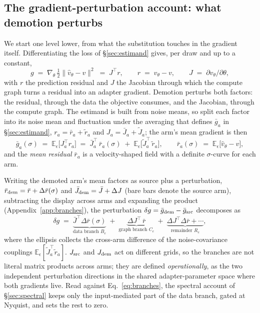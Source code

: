 \subsection{The gradient-perturbation account: what demotion perturbs}
\label{sec:ouraccount}

We start one level lower, from what the substitution touches
in the gradient itself. Differentiating the loss of
\S\ref{sec:estimand} gives, per draw and up to a constant,
\begin{equation*}
g \;=\; \nabla_\theta\, \tfrac12\big\|\hat v_\theta - v\big\|^2
\;=\; J^{\!\top} r,
\qquad
r \;=\; \hat v_\theta - v,
\qquad
J \;=\; \partial \hat v_\theta / \partial \theta,
\end{equation*}
with $r$ the prediction residual and $J$ the Jacobian through which
the compute graph turns a residual into an adapter gradient.
Demotion perturbs both factors: the residual, through the data the
objective consumes, and the Jacobian, through the compute graph. The
estimand is built from noise means, so split each factor into its
noise mean and fluctuation under the averaging that defines
$\bar g_a$ in \S\ref{sec:estimand}, $r_a = \bar r_a + \tilde r_a$ and
$J_a = \bar J_a + \tilde J_a$; the arm's mean gradient is then
\begin{equation*}
\bar g_a(\sigma)
\;=\; \mathbb{E}_\epsilon\!\big[J_a^{\!\top} r_a\big]
\;=\; \bar J_a^{\!\top}\,\bar r_a(\sigma)
\;+\; \mathbb{E}_\epsilon\!\big[\tilde J_a^{\!\top}\,\tilde r_a\big],
\qquad
\bar r_a(\sigma) \;=\; \mathbb{E}_\epsilon\big[\hat v_\theta - v\big],
\end{equation*}
and the \emph{mean residual} $\bar r_a$ is a velocity-shaped field
with a definite $\sigma$-curve for each arm.

Writing the demoted
arm's mean factors as source plus a perturbation,
$\bar r_{\mathrm{dem}} = \bar r + \Delta\bar r(\sigma)$ and
$\bar J_{\mathrm{dem}} = \bar J + \Delta J$ (bare bars denote the source arm),
subtracting the display across arms and expanding the product
(Appendix~\ref{app:branches}), the perturbation
$\delta g = \bar g_{\mathrm{dem}} - \bar g_{\mathrm{src}}$ decomposes as
\begin{equation}
\delta g \;=\;
\underbrace{\bar J^{\!\top}\Delta \bar r(\sigma)}_{\text{data branch }B_e}
\;+\; \underbrace{\Delta J^{\!\top}\, \bar r}_{\text{graph branch }C_e}
\;+\; \underbrace{\Delta J^{\!\top}\Delta \bar r + \cdots}_{\text{remainder }R_e},
\label{eq:branches}
\end{equation}
where the ellipsis collects the cross-arm difference of the
noise-covariance couplings
$\mathbb{E}_\epsilon[\tilde J_a^{\!\top}\tilde r_a]$.
$J_{\mathrm{src}}$ and $J_{\mathrm{dem}}$ act on different grids, so the branches are
not literal matrix products across arms; they are defined
\emph{operationally}, as the two independent perturbation directions in
the shared adapter-parameter space where both gradients live. Read
against Eq.~\ref{eq:branches}, the spectral account of
\S\ref{sec:spectral} keeps only the input-mediated part of the data
branch, gated at Nyquist, and sets the rest to zero.

